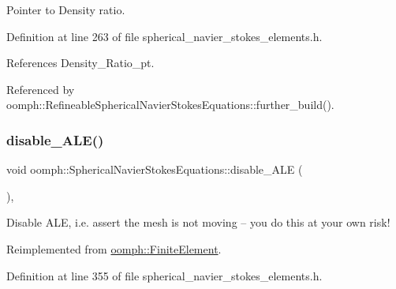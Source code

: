 Pointer to Density ratio. 



Definition at line 263 of file spherical\+\_\+navier\+\_\+stokes\+\_\+elements.\+h.



References Density\+\_\+\+Ratio\+\_\+pt.



Referenced by oomph\+::\+Refineable\+Spherical\+Navier\+Stokes\+Equations\+::further\+\_\+build().

\mbox{\label{classoomph_1_1SphericalNavierStokesEquations_a88010a11c69e6d5f189f5ce24e6c70da}} 
\subsubsection{\texorpdfstring{disable\+\_\+\+A\+L\+E()}{disable\_ALE()}}
{\footnotesize\ttfamily void oomph\+::\+Spherical\+Navier\+Stokes\+Equations\+::disable\+\_\+\+A\+LE (\begin{DoxyParamCaption}{ }\end{DoxyParamCaption})\hspace{0.3cm}{\ttfamily [inline]}, {\ttfamily [virtual]}}



Disable A\+LE, i.\+e. assert the mesh is not moving -- you do this at your own risk! 



Reimplemented from \hyperlink{classoomph_1_1FiniteElement_a625ea6d3f9baccfbdd1323315fb3ec71}{oomph\+::\+Finite\+Element}.



Definition at line 355 of file spherical\+\_\+navier\+\_\+stokes\+\_\+elements.\+h.

\mbox{\label{classoomph_1_1SphericalNavierStokesEquations_aa9939f3a44b64430e10e28657d70634c}} 
